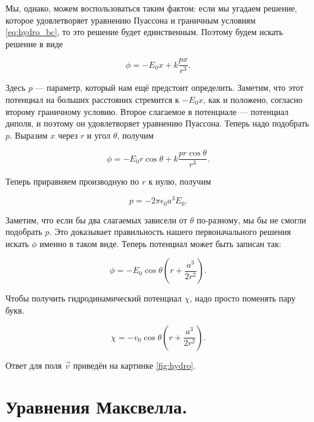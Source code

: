\documentclass[11pt,a4paper]{article}
\numberwithin{equation}{section}
\newcommand{\eps}{\epsilon}
\begin{document}
Мы, однако, можем воспользоваться таким фактом: если мы угадаем
решение, которое удовлетворяет уравнению Пуассона и граничным
условиям \eqref{eq:hydro_bc}, то это решение будет
единственным. Поэтому будем искать решение в виде 

\begin{equation}
  \label{eq:hydro_4}
  \phi = -E_0 x + k\frac{px}{r^3}.
\end{equation}

Здесь $p$ --- параметр, который нам ещё предстоит определить. Заметим,
что этот потенциал на больших расстояних стремится к $-E_0 x$, как и
положено, согласно второму граничному условию. Второе слагаемое в
потенциале --- потенциал диполя, и поэтому он удовлетворяет уравнению
Пуассона. Теперь надо подобрать $p$. Выразим $x$ через $r$ и угол
$\theta$, получим

\begin{equation}
  \label{eq:hydro_5}
  \phi = - E_0 r \cos \theta + k \frac{p r \cos \theta}{r^3}.
\end{equation}

Теперь приравняем производную по $r$ к нулю, получим

\begin{equation}
  \label{eq:hydro_6}
  p = -2\pi \eps_0 a^3 E_0.
\end{equation}

Заметим, что если бы два слагаемых зависели от $\theta$ по-разному, мы
бы не смогли подобрать $p$. Это доказывает правильность нашего
первоначального решения искать $\phi$ именно в таком виде. Теперь
потенциал может быть записан так: 

\begin{equation}
  \label{eq:hydro_7}
  \phi = -E_0 \cos \theta \left(r + \frac{a^3}{2r^2} \right).
\end{equation}

Чтобы получить гидродинамический потенциал $\chi$, надо просто
поменять пару букв. 

\begin{equation}
  \label{eq:hydro_8}
  \chi = - v_0 \cos \theta \left(r + \frac{a^3}{2r^2} \right).
\end{equation}

Ответ для поля $\vec{v}$ приведён на картинке \ref{fig:hydro}.

\section{Уравнения Максвелла.}
\label{sec:maxwell}
\end{document}
